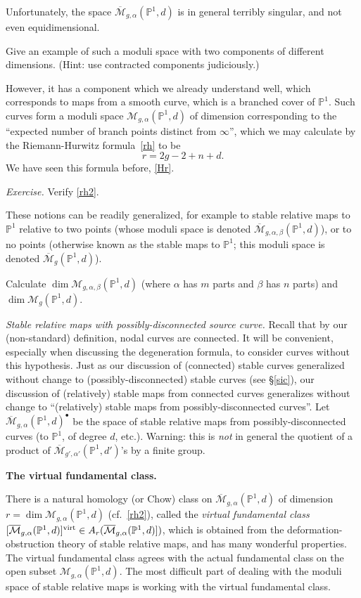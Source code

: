\documentclass[12pt,letterpaper]{amsart}
\newcommand{\epoint}[1]{\vspace{3mm}\par \noindent \refstepcounter{subsection}{\bf \thesubsection.} 
  {\em #1.} }
\newcommand{\bpoint}[1]{\vspace{3mm}\par \noindent \refstepcounter{subsection}{\bf \thesubsection.} 
  {\bf #1.} }
\newcommand{\proj}{\mathbb P}
\newcommand{\cm}{{\mathcal{M}}}
\newcommand{\cmbar}{\overline{\cm}}
\newcommand{\al}{\alpha}
\newcommand{\be}{\beta}
\newcommand{\dis}{\bullet}
\newcommand{\virt}{\rm{virt}}
\newcommand{\lremind}[1]{{\bf[label:  #1]}}
\renewcommand{\lremind}[1]{{}}
\begin{document}
{Unfortunately, the space $\cmbar_{g,\al}(\proj^1, d)$ is in general
terribly singular, and not even equidimensional.  

  Give an example of such a moduli
space with two components of different dimensions.  (Hint:
use contracted components judiciously.)

However, it has a component which we already understand well, which
corresponds to maps from a smooth curve, which is a branched cover of
$\proj^1$.  Such curves form a moduli space $\cm_{g,\al}(\proj^1,d)$
of dimension corresponding to the ``expected number of branch points
distinct from $\infty$'', which we may calculate by the
Riemann-Hurwitz formula~\eqref{rh} to be \lremind{rh2}
\begin{equation}
\label{rh2}
r = 2g-2+n+d.\end{equation}
We have seen this formula before, \eqref{Hr}.

\noindent
{\em Exercise.}  Verify \eqref{rh2}.

These notions can be readily generalized, for example
to stable relative maps to $\proj^1$ relative to two points
(whose moduli space is denoted $\cmbar_{g,\al,\be}(\proj^1,d)$),
or to no points (otherwise known as the stable maps to $\proj^1$;
this moduli space is denoted $\cmbar_{g}(\proj^1,d)$).

Calculate $\dim \cm_{g,\al,\be}(\proj^1,d)$ (where $\al$ has $m$ parts
and $\be$ has $n$ parts) and $\dim \cm_{g}(\proj^1,d)$.

\epoint{Stable relative maps with possibly-disconnected source curve}
Recall that by our (non-standard) definition, nodal curves are connected.
It will be convenient, especially when discussing the degeneration
formula, to consider curves without this hypothesis.
Just as our discussion of (connected) stable curves generalized without
change to (possibly-disconnected) stable curves (see \S \ref{sic}),
our discussion of (relatively) stable maps from connected curves generalizes
without change to ``(relatively) stable maps from possibly-disconnected curves''.
Let $\cmbar_{g,\al}(\proj^1,d)^{\dis}$ be the space of stable relative
maps from possibly-disconnected curves (to $\proj^1$, of degree $d$,
etc.).  
Warning:  this is {\em not} in general the quotient of a product
of $\cmbar_{g', \al'}(\proj^1, d')$'s by a finite group.

\bpoint{The virtual fundamental class}

There is a natural homology (or Chow) class on
$\cmbar_{g,\al}(\proj^1, d)$ of dimension $r= \dim
\cm_{g,\al}(\proj^1,d)$ (cf.\ \eqref{rh2}), called the {\em virtual
  fundamental class}
$[ \cmbar_{g,\al}(\proj^1,d)]^{\virt} \in A_r(\cmbar_{g,\al}(\proj^1,d)])$, 
which is obtained from the
deformation-obstruction theory of stable relative maps, and has many
wonderful properties.  The virtual fundamental class agrees with the
actual fundamental class on the open subset  $\cm_{g,\al}(\proj^1,d)$.  The most
difficult part of dealing with the moduli space of stable relative
maps is working with the virtual fundamental class.

}
\end{document}
